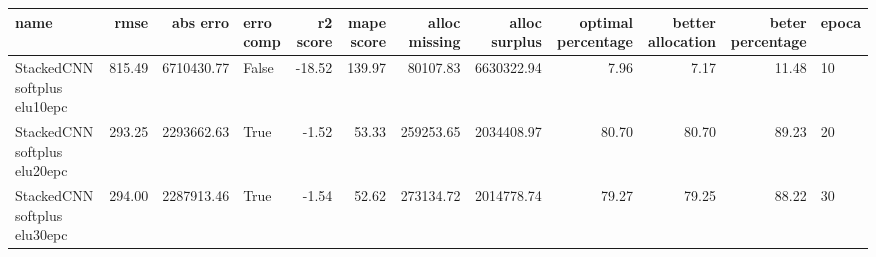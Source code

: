 \begin{tabular}{lrrlrrrrrrrl}
\toprule
name & rmse & abs erro & erro comp & r2 score & mape score & alloc missing & alloc surplus & optimal percentage & better allocation & beter percentage & epoca \\
\midrule
StackedCNN softplus elu10epc & 815.49 & 6710430.77 & False & -18.52 & 139.97 & 80107.83 & 6630322.94 & 7.96 & 7.17 & 11.48 & 10 \\
StackedCNN softplus elu20epc & 293.25 & 2293662.63 & True & -1.52 & 53.33 & 259253.65 & 2034408.97 & 80.70 & 80.70 & 89.23 & 20 \\
StackedCNN softplus elu30epc & 294.00 & 2287913.46 & True & -1.54 & 52.62 & 273134.72 & 2014778.74 & 79.27 & 79.25 & 88.22 & 30 \\
\bottomrule
\end{tabular}
